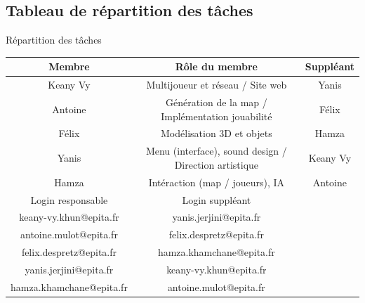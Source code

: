 \documentclass[
	article,			%
	11pt,				%
	oneside,			%
	a4paper,			%
	chapter=TITLE,
	french,			%
	sumario=tradicional
	]{base_nt}
\begin{document}
\subsection{Tableau de répartition des tâches}

\begin{quadro}
	\caption{Répartition des tâches}
	\centering
	\begin{tabular}{|c|c|c|}
		\hline
		Membre   & Rôle du membre & Suppléant  \\
		\hline
		Keany Vy & Multijoueur et réseau / Site web & Yanis \\
		Antoine & Génération de la map / Implémentation jouabilité & Félix \\
		Félix & Modélisation 3D et objets & Hamza \\
            Yanis & Menu (interface), sound design / Direction artistique  & Keany Vy \\
            Hamza & Intéraction (map / joueurs), IA  & Antoine \\
		\hline
		Login responsable &  Login suppléant  & \\
            \hline
            keany-vy.khun@epita.fr & yanis.jerjini@epita.fr & \\
            antoine.mulot@epita.fr & felix.despretz@epita.fr & \\
            felix.despretz@epita.fr & hamza.khamchane@epita.fr & \\
            yanis.jerjini@epita.fr & keany-vy.khun@epita.fr & \\
            hamza.khamchane@epita.fr & antoine.mulot@epita.fr & \\
            \hline
	\end{tabular}
\end{quadro}
\end{document}
